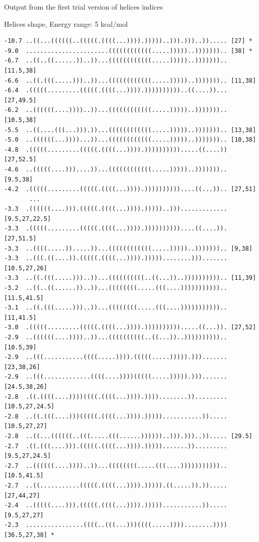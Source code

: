 \documentclass[ignorenonframetext,10pt]{beamer}
\begin{document}
\begin{frame}[fragile]
  Output from the first trial version of helices indices
  \begin{block}{\tiny Helices shape, Energy range: 5 kcal/mol}
  \tiny
  \begin{verbatim}
-10.7 ..((...((((((..(((((.((((...)))).)))))..))).)))..))..... [27] *
-9.0  .......................((((((((((((.....)))))..))))))).. [38] *
-6.7  ..((..((......))..))...((((((((((((.....)))))..))))))).. [11.5,38]
-6.6  ..((.(((.....)))..))...((((((((((((.....)))))..))))))).. [11,38]
-6.4  .(((((.........(((((.((((...)))).))))))))))..((....))... [27,49.5]
-6.2  ..((((((....))))..))...((((((((((((.....)))))..))))))).. [10.5,38]
-5.5  ..((....(((...))).))...((((((((((((.....)))))..))))))).. [13,38]
-5.0  ..((((((...))))...))...((((((((((((.....)))))..))))))).. [10,38]
-4.8  .(((((.........(((((.((((...)))).)))))))))).....((....)) [27,52.5]
-4.6  ..(((((....)))....))...((((((((((((.....)))))..))))))).. [9.5,38]
-4.2  .(((((.........(((((.((((...)))).))))))))))....((...)).. [27,51]
       ...
-3.3  .((((((....))).(((((.((((...)))).)))))..)))............. [9.5,27,22.5]
-3.3  .(((((.........(((((.((((...)))).))))))))))....((....)). [27,51.5]
-3.3  ..((((.....)).....))...((((((((((((.....)))))..))))))).. [9,38]
-3.3  ..(((.((....)).(((((.((((...)))).)))))........)))....... [10.5,27,26]
-3.3  ..((.(((.....)))..))...((((((((((..((...))..)))))))))).. [11,39]
-3.2  ..((..((......))..))...((((((((.....(((....))))))))))).. [11.5,41.5]
-3.1  ..((.(((.....)))..))...((((((((.....(((....))))))))))).. [11,41.5]
-3.0  .(((((.........(((((.((((...)))).)))))))))).....((...)). [27,52]
-2.9  ..((((((....))))..))...((((((((((..((...))..)))))))))).. [10.5,39]
-2.9  ..(((...........((((.....)))).(((((.....))))).)))....... [23,38,26]
-2.9  ..(((.............((((....))))(((((.....))))).)))....... [24.5,38,26]
-2.8  .((.((((....))))((((.((((...)))).))))........))......... [10.5,27,24.5]
-2.8  ..((.(((....)))(((((.((((...)))).)))))...........))..... [10.5,27,27]
-2.8  ..((...((((((..(((.....(((......))))))..))).)))..))..... [29.5]
-2.7  .((.(((....))).(((((.((((...)))).))))).......))......... [9.5,27,24.5]
-2.7  ..((((((....))))..))...((((((((.....(((....))))))))))).. [10.5,41.5]
-2.7  ..((...........(((((.((((...)))).))))).((.....)).))..... [27,44,27]
-2.4  ..(((((....))).(((((.((((...)))).)))))...........))..... [9.5,27,27]
-2.3  ................((((..(((...)))((((.....))))........)))) [36.5,27,38] *
  \end{verbatim} 
  \end{block}
\end{frame}
\end{document}
